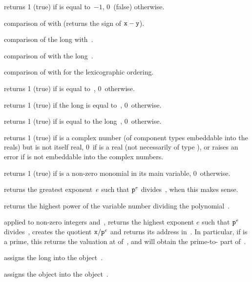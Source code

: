 returns 1 (true) if  is equal to~$-1$,
0~(false) otherwise.

 comparison of  with  (returns
the sign of ${\tt x}-{\tt y}$).

 comparison of the long  with~.

 comparison of  with the long~.

 comparison of  with  for the
lexicographic ordering.

 returns 1 (true) if  is equal
to~, 0~otherwise.

 returns 1 (true) if the long  is
equal to~, 0~otherwise.

 returns 1 (true) if  is equal to
the long~, 0~otherwise.

 returns 1 (true) if  is a complex number
(of component types embeddable into the reals) but is not itself real, 0~if
 is a real (not necessarily of type ), or raises an error
if  is not embeddable into the complex numbers.

 returns 1 (true) if  is a non-zero monomial
in its main variable, 0~otherwise.

 returns the greatest exponent~$e$ such that
${\tt p}^e$ divides~, when this makes sense.

 returns the highest power of the variable
number  dividing the polynomial~.

 applied to non-zero integers
 and~, returns the highest exponent $e$ such that
${\tt p}^{e}$ divides~, creates the quotient ${\tt x}/{\tt p}^{e}$
and returns its address in~.
In particular, if  is a prime, this returns the valuation at 
of~, and  will obtain the prime-to- part of~.


 assigns the long  into the
object~.

 assigns the object  into the
object~.

